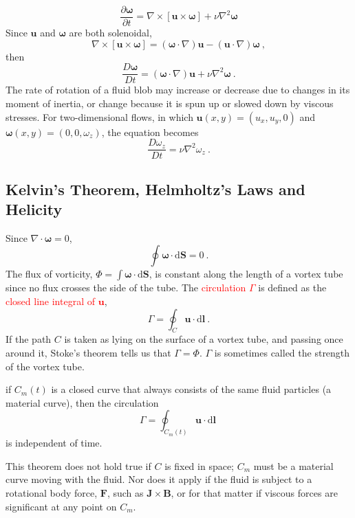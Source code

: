 \documentclass[12pt,a4paper]{article}
\renewcommand{\vec}[1]{\boldsymbol{#1}}
\newcommand{\dif}{\mathrm{d}}
\newcounter{theo}[section]\setcounter{theo}{0}
\begin{document}
\begin{equation}
\frac{\partial \vec{\omega}}{\partial t} = \nabla \times [\vec{u}\times \vec{\omega}] +\nu \nabla^2 \vec{\omega}
\end{equation}
Since $\vec{u}$ and $\vec{\omega}$ are both solenoidal,
\begin{equation*}
\nabla \times [\vec{u}\times \vec{\omega}] = (\vec{\omega} \cdot \nabla) \vec{u} -(\vec{u} \cdot \nabla) \vec{\omega}  ~,
\end{equation*}
then
\begin{equation}
\frac{D \vec{\omega}}{D t} = (\vec{\omega} \cdot \nabla) \vec{u}+\nu \nabla^2 \vec{\omega} ~.
\end{equation}
The rate of rotation of a fluid blob may increase or decrease due to changes in its moment of inertia, or change because it is spun up or slowed down by viscous stresses. For two-dimensional flows, in which $\vec{u}(x, y) = (u_x, u_y, 0)$ and $\vec{\omega}(x, y) = (0, 0, \omega_z)$, the equation becomes
\begin{equation}
\frac{D \omega_z}{D t} = \nu \nabla^2 \omega_z ~.
\end{equation}



\subsection{Kelvin's Theorem, Helmholtz's Laws and Helicity}
Since $\nabla \cdot \vec{\omega} = 0$, 
\begin{equation}
\oint \vec{\omega} \cdot \dif \vec{S} = 0 ~.
\end{equation}
The flux of vorticity, $\Phi = \int \vec{\omega} \cdot \dif \vec{S}$, is constant along the length of a vortex tube since no flux crosses the side of the tube. The \textcolor{red}{circulation $\Gamma$} is defined as the \textcolor{red}{closed line integral of $\vec{u}$},
\begin{equation}
\Gamma = \oint_C \vec{u} \cdot \dif \vec{l} ~.
\end{equation}
If the path $C$ is taken as lying on the surface of a vortex tube, and passing once around it, Stoke's theorem tells us that $\Gamma  = \Phi$.  $\Gamma$ is sometimes called the strength of the vortex tube. 
\begin{tcolorbox}[colback=green!15,colframe=green!40!black,title=Kelvin's theorem]
 if $C_m(t)$ is a closed curve that always consists of the same fluid particles (a material curve), then the circulation
\begin{equation}
\Gamma = \oint_{C_m(t)} \vec{u} \cdot \dif \vec{l} ~
\end{equation}
is independent of time.
\end{tcolorbox}
This theorem does not hold true if $C$ is fixed in space; $C_m$ must be a material curve moving with the fluid. Nor does it apply if the fluid is subject to a rotational body force, $\vec{F}$, such as $\vec{J}\times \vec{B}$, or for that matter if viscous forces are significant at any point on $C_m$.
\end{document}
